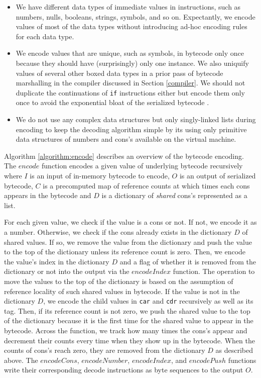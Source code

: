 \documentclass[sigplan, anonymous, review]{acmart}
\begin{document}
\begin{itemize}
  \item We have different data types of immediate values in instructions,
    such as numbers, nulls, booleans, strings, symbols, and so on.
    Expectantly, we encode values of most of the data types without
    introducing ad-hoc encoding rules for each data type.
  \item We encode values that are unique, such as symbols, in
    bytecode only once
    because they should have (surprisingly) only one instance.
    We also uniquify values of several other boxed data
    types in a prior pass of bytecode marshalling in the
    compiler discussed in Section \ref{compiler}.
    We should not duplicate the continuations of \texttt{if}
    instructions either but encode them only once to avoid the exponential bloat
    of the serialized bytecode \cite{ribbit7kb2023}.
  \item We do not use any complex data structures but only singly-linked lists
    during encoding to keep the decoding algorithm simple by its using
    only primitive data structures of numbers and cons's available on
    the virtual machine.
\end{itemize}

Algorithm \ref{algorithm:encode} describes an overview of the bytecode
encoding.
The $encode$ function encodes a given value of
underlying bytecode recursively where $I$ is an input of in-memory
bytecode to encode,
$O$ is an output of serialized bytecode, $C$ is a precomputed map of
reference counts
at which times each cons appears in the bytecode and $D$ is a
dictionary of \textit{shared} cons's represented as a list.

For each given value, we check if the value is a cons or not.
If not, we encode it as a number.
Otherwise, we check if the cons already exists in the dictionary $D$ of
shared values.
If so, we remove the value from the dictionary and push the value to
the top of the dictionary unless its reference count is zero.
Then, we encode the value's index in the dictionary $D$ and a flag of whether it
is removed from the dictionary or not into the output via the
$encodeIndex$ function.
The operation to move the values to the top of the dictionary is based on the
assumption of reference locality of such shared values in bytecode.
If the value is not in the dictionary $D$, we encode the child values in
\texttt{car} and \texttt{cdr} recursively as well as its tag.
Then, if its reference count is not zero, we push the shared value to
the top of the dictionary because it is the first time for the shared value
to appear in the bytecode.
Across the function, we track how many times the cons's appear and
decrement their counts every time when they show up in the bytecode.
When the counts of cons's reach zero, they are removed from the
dictionary $D$ as described above.
The $encodeCons$, $encodeNumber$, $encodeIndex$, and $encodePush$
functions write their corresponding decode instructions as byte
sequences to the output $O$.
\end{document}
